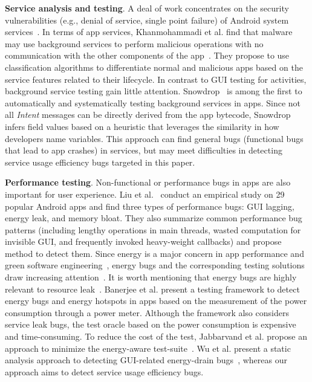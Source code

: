 \documentclass[sigconf,review, anonymous]{acmart}
\begin{document}
\textbf{Service analysis and testing}. A deal of work concentrates on the security vulnerabilities (e.g., denial of service, single point failure) of Android system services~\cite{ReavesBGABCDHKS16,HuangZ0015,WangZL16,FengS16,AbualolaAKOM16,LuoZCCLLGYXL17}. 
In terms of app services, Khanmohammadi et al. find that malware may use background services to perform malicious operations with no communication with the other components of the app~\cite{KhRH15}. They propose to use classification algorithms to differentiate normal and malicious apps based on the service features related to their lifecycle. In contrast to GUI testing for activities, background service testing gain little attention. \textsf{Snowdrop}~\cite{ZhangLLC17} is among the first to automatically and systematically testing background services in apps. Since not all \textit{Intent} messages can be directly derived from the app bytecode, \textsf{Snowdrop} infers field values based on a heuristic that leverages the similarity in how developers name variables. This approach can find general bugs (functional bugs that lead to app crashes) in services, but may meet difficulties in detecting service usage efficiency bugs targeted in this paper.    

\textbf{Performance testing}. Non-functional or performance bugs in apps are also important for user experience. Liu et al.~\cite{LiuXC14} conduct an empirical study on 29 popular Android apps and find three types of performance bugs: GUI lagging, energy leak, and memory bloat. They also summarize common performance bug patterns (including lengthy operations in main threads, wasted computation for invisible GUI, and frequently invoked heavy-weight callbacks) and propose method to detect them. Since energy is a major concern in app performance and green software engineering~\cite{PangHAH16,HoqueSKXT16,MBZSJSPC16,0036990}, energy bugs and the corresponding testing solutions draw increasing attention~\cite{GuoZYZZ13,BanerjeeC0R14,LiuXCL14,BehrouzSBM16,WuYR16,JabbarvandM17}.   It is worth mentioning that energy bugs are highly relevant to resource leak~\cite{GuoZYZZ13,BanerjeeC0R14,LiuXCL14,WuYR16}. Banerjee et al. present a testing framework to detect energy bugs and energy hotspots in apps based on the measurement of the power consumption through a power meter. Although the framework also considers service leak bugs, the test oracle based on the power consumption is expensive and time-consuming. To reduce the cost of the test, Jabbarvand et al. propose an approach to minimize the energy-aware test-suite~\cite{BehrouzSBM16}. Wu et al. present a static analysis approach to detecting GUI-related energy-drain bugs~\cite{WuYR16}, whereas our approach aims to detect service usage efficiency bugs.     
\end{document}
